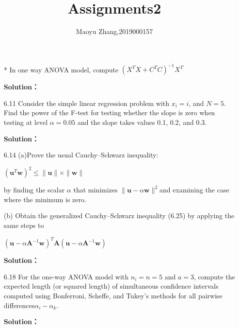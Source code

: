 \documentclass[a4paper]{article}
\begin{document}
\setlength{\leftskip}{20pt}
\title{ Assignments2}
\author{Maoyu Zhang,2019000157}

 \maketitle





\begin{enumerate} %

\item[*] 
In one way ANOVA model, compute $(X^TX+C^TC)^{-1}X^T$ 

 {\bf Solution：}
 
 
 \item[6.11] 
 Consider the simple linear regression problem with $ x_i = i$, and $N = 5$. Find the power of the F-test for testing whether the slope is zero when testing at level $\alpha = 0.05$ and the slope takes values 0.1, 0.2, and 0.3.

 {\bf Solution：}
 


 \item[6.14] 
(a)Prove the usual Cauchy–Schwarz inequality:
\begin{center}
    $\left(\mathbf{u}^{T} \mathbf{w}\right)^{2} \leq\|\mathbf{u}\| \times\|\mathbf{w}\|$
\end{center}
by finding the scalar $\alpha$ that minimizes $\|\mathbf{u}-\alpha \mathbf{w}\|^2 $and examining the case where the minimum is zero.

(b)
Obtain the generalized Cauchy–Schwarz inequality (6.25) by applying
the same steps to
\begin{center}
    $\left(\mathbf{u}-\alpha \mathbf{A}^{-1} \mathbf{w}\right)^{T} \mathbf{A}\left(\mathbf{u}-\alpha \mathbf{A}^{-1} \mathbf{w}\right)$
\end{center}

 {\bf Solution：}
 
 
 
 \item[6.18] 
 For the one-way ANOVA model with $n_i = n = 5$ and $a = 3$, compute the expected length (or squared length) of simultaneous confidence intervals computed using Bonferroni, Scheffe, and Tukey’s methods for all pairwise differences$\alpha_i-\alpha_k$.
 
 {\bf Solution：}
 

 
\end{enumerate}
 
% 
\end{document}
